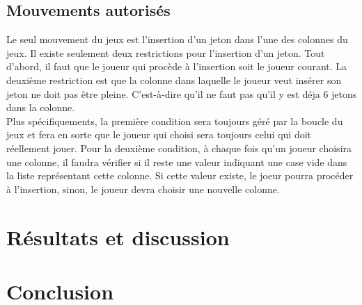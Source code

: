\documentclass[12pt]{article}
\begin{document}
\subsection*{Mouvements autorisés}
Le seul mouvement du jeux est l'insertion d'un jeton dans l'une des colonnes du jeux. Il existe seulement deux restrictions pour l'insertion d'un jeton. Tout d'abord, il faut que le joueur qui procède à l'insertion soit le joueur courant. La deuxième restriction est que la colonne dans laquelle le joueur veut insérer son jeton ne doit pas être pleine. C'est-à-dire qu'il ne faut pas qu'il y est déja 6 jetons dans la colonne. \\

Plus spécifiquements, la première condition sera toujours géré par la boucle du jeux  et fera en sorte que le joueur qui choisi sera toujours celui qui doit réellement jouer. Pour la deuxième condition, à chaque fois qu'un joueur choisira une colonne, il faudra vérifier si il reste une valeur indiquant une case vide dans la liste représentant cette colonne. Si cette valeur existe, le joeur pourra procéder à l'insertion, sinon, le joueur devra choisir une nouvelle colonne. 

\section*{Résultats et discussion}

\section*{Conclusion}
\end{document}
